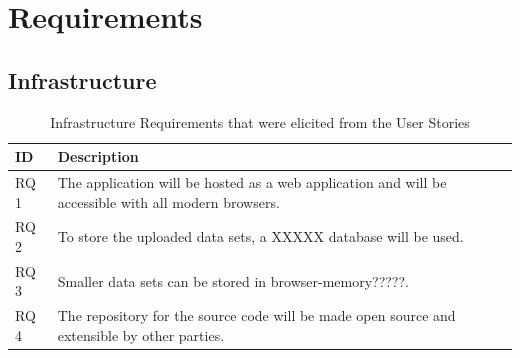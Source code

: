 \section{Requirements}

\iffalse

\subsection{Infrastructure}
\begin{table}[]
\centering
\begin{tabular}{|p{1.1cm}|p{12cm}|}
\hline
\textbf{ID} & \textbf{Description} \\ \hline
RQ 1 & The application will be hosted as a web application and will be accessible with all modern browsers.\\ \hline
RQ 2 & To store the uploaded data sets, a XXXXX database will be used.\\ \hline
RQ 3 & Smaller data sets can be stored in browser-memory?????.\\ \hline
RQ 4 & The repository for the source code will be made open source and extensible by other parties.\\ \hline

\end{tabular}
\caption{Infrastructure Requirements that were elicited from the User Stories}
\label{table:2}
\end{table}

